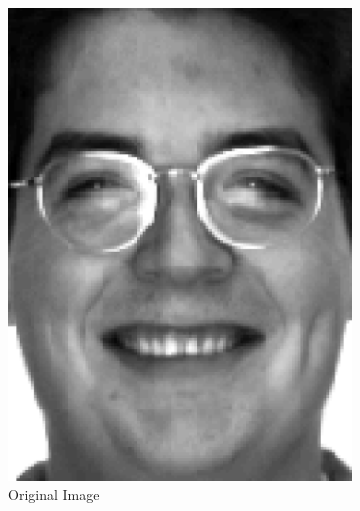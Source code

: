 \documentclass[review]{elsarticle}
\begin{document}
\begin{figure}[H]
 \hspace*{\fill}
\centering
\begin{subfigure}[b]{0.18\textwidth}
\centering
	\includegraphics[width=\linewidth]{Fig_6a}
		\caption{Original Image}
	\label{fig:orig_image_ex_4} \hfill
\end{subfigure}
\begin{subfigure}[b]{0.18\textwidth} 
\centering

\end{subfigure}
\end{figure}
\end{document}
